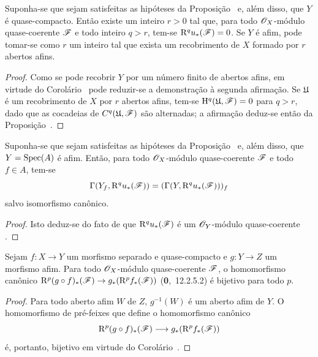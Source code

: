 \begin{corollary}[1.4.12]
\label{III.1.4.12}
Suponha-se que sejam satisfeitas as hipóteses da Proposição~ e, além disso, que $Y$ é quase-compacto.
Então existe um inteiro $r>0$ tal que, para todo $\mathscr{O}_X$-módulo quase-coerente $\mathscr{F}$ e todo inteiro $q>r$, tem-se $\mathrm{R}^q u_*(\mathscr{F})=0$.
Se $Y$ é afim, pode tomar-se como $r$ um inteiro tal que exista um recobrimento de $X$ formado por $r$ abertos afins.
\end{corollary}

\begin{proof}
Como se pode recobrir $Y$ por um número finito de abertos afins, em virtude do Corolário~ pode reduzir-se a demonstração à segunda afirmação.
Se $\mathfrak{U}$ é um recobrimento de $X$ por $r$ abertos afins, tem-se $\mathrm{H}^q(\mathfrak{U},\mathscr{F})=0$ para $q>r$, dado que as cocadeias de $C^q(\mathfrak{U},\mathscr{F})$ são alternadas; a afirmação deduz-se então da Proposição~.
\end{proof}

\begin{corollary}[1.4.13]
\label{III.1.4.13}
Suponha-se que sejam satisfeitas as hipóteses da Proposição~ e, além disso, que $Y=\operatorname{Spec}(A)$ é afim.
Então, para todo $\mathscr{O}_X$-módulo quase-coerente $\mathscr{F}$ e todo $f\in A$, tem-se
\[
  \Gamma(Y_f,\mathrm{R}^q u_*(\mathscr{F}))=(\Gamma(Y,\mathrm{R}^q u_*(\mathscr{F})))_f
\]
salvo isomorfismo canônico.
\end{corollary}

\begin{proof}
Isto deduz-se do fato de que $\mathrm{R}^q u_*(\mathscr{F})$ é um $\mathscr{O}_Y$-módulo quase-coerente .
\end{proof}

\begin{proposition}[1.4.14]
\label{III.1.4.14}
Sejam $f:X\to Y$ um morfismo separado e quase-compacto e $g:Y\to Z$ um morfismo afim.
Para todo $\mathscr{O}_X$-módulo quase-coerente $\mathscr{F}$, o homomorfismo canônico $\RR^p(g\circ f)_*(\sh{F})\to g_*(\RR^p f_*(\sh{F}))$ (\textbf{0},~12.2.5.2) é bijetivo para todo $p$.
\end{proposition}

\begin{proof}
Para todo aberto afim $W$ de $Z$, $g^{-1}(W)$ é um aberto afim de $Y$.
O homomorfismo de pré-feixes que define o homomorfismo canônico
\[
  \RR^p(g\circ f)_*(\sh{F})\to g_*(\RR^p f_*(\sh{F}))
\]
 é, portanto, bijetivo em virtude do Corolário~.
\end{proof}


